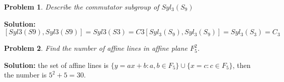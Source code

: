 \documentclass[12pt]{article}
\newtheorem{problem}{Problem}
\begin{document}
\begin{problem}
Describe the commutator subgroup of $Syl_{3}(S_{9})$
\end{problem}

\textbf{Solution:} $[Syl3(S9),Syl3(S9)]=Syl3(S3)=C3[Syl_{3}(S_{9}), Syl_{3}(S_{9})]=Syl_{3}(S_{3})=C_{3}$

\begin{problem}
Find the number of affine lines in affine plane $F_{5}^{2}$.
\end{problem}

\textbf{Solution:} the set of affine lines is $\{y=ax+b: a, b\in F_{5}\}\cup \{x=c: c\in F_{5}\}$, then the number is $5^2+5=30$.
\end{document}
